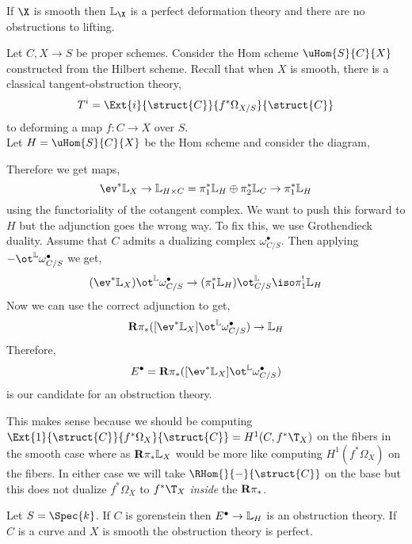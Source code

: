 \documentclass[12pt]{article}
\begin{document}
\begin{example}
If $\X$ is smooth then $\LL_{\X}$ is a perfect deformation theory and there are no obstructions to lifting. 
\end{example}

\begin{example}
Let $C, X \to S$ be proper schemes. Consider the Hom scheme $\uHom{S}{C}{X}$ constructed from the Hilbert scheme. Recall that when $X$ is smooth, there is a classical tangent-obstruction theory,
\[ T^i = \Ext{i}{\struct{C}}{f^* \Omega_{X/S}}{\struct{C}} \]
to deforming a map $f : C \to X$ over $S$.
\bigskip\\
Let $H = \uHom{S}{C}{X}$ be the Hom scheme and consider the diagram,
\begin{center}
\end{center}
Therefore we get maps,
\[ \ev^* \LL_{X} \to \LL_{H \times C} = \pi_1^* \LL_{H} \oplus \pi_2^* \LL_{C} \to \pi^*_1 \LL_{H} \]
using the functoriality of the cotangent complex. We want to push this forward to $H$ but the adjunction goes the wrong way. To fix this, we use Grothendieck duality. Assume that $C$ admits a dualizing complex $\omega_{C/S}^\bullet$. Then applying $- \ot^{\LL} \omega_{C/S}^\bullet$ we get,
\[ (\ev^* \LL_X) \ot^{\LL} \omega_{C/S}^\bullet \to (\pi_1^* \LL_{H}) \ot^{\LL}_{C/S} \iso \pi_1^! \LL_{H} \]
Now we can use the correct adjunction to get,
\[ \R \pi_* ([\ev^* \LL_{X}] \ot^{\LL} \omega_{C/S}^\bullet) \to \LL_{H} \]
Therefore, 
\[ E^\bullet = \R \pi_* ([\ev^* \LL_{X}] \ot^{\LL} \omega_{C/S}^\bullet) \]
is our candidate for an obstruction theory.
\end{example}

\begin{rmk}
This makes sense because we should be computing $\Ext{1}{\struct{C}}{f^* \Omega_X}{\struct{C}} = H^1(C, f^* \T_X)$ on the fibers in the smooth case where as $\mathbf{R} \pi_* \mathbb{L}_{X}$ would be more like computing $H^1(f^* \Omega_X)$ on the fibers. In either case we will take $\RHom{}{-}{\struct{C}}$ on the base but this does not dualize $f^* \Omega_X$ to $f^* \T_X$ \textit{inside} the $\mathbf{R} \pi_*$.
\end{rmk}

\begin{theorem}
Let $S = \Spec{k}$. If $C$ is gorenstein then $E^\bullet \to \mathbb{L}_{H}$ is an obstruction theory. If $C$ is a curve and $X$ is smooth the obstruction theory is perfect.
\end{theorem}
\end{document}
